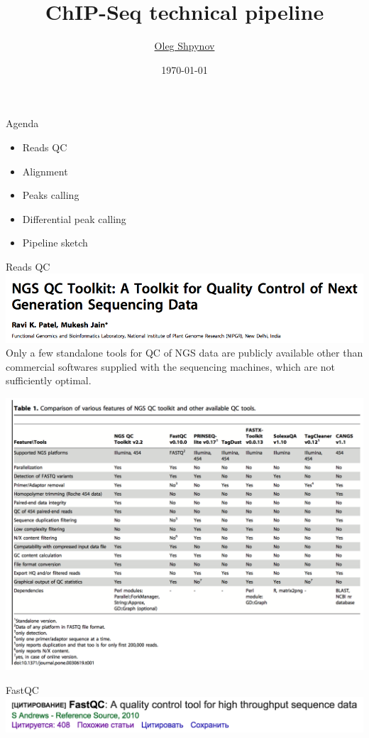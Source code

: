 \documentclass{beamer}
\title{ChIP-Seq technical pipeline}
\author{\href{mailto:os@jetbrains.com}{Oleg Shpynov}}
\institute{JetBrains Biolabs}
\date{\today}
\begin{document}
\begin{frame}
  \titlepage
\end{frame}

\begin{frame}{Agenda}
\begin{itemize}
	\item Reads QC
	\item Alignment
	\item Peaks calling
	\item Differential peak calling
	\item Pipeline sketch
\end{itemize}
\end{frame}

\begin{frame}{Reads QC}
\includegraphics[width=\linewidth]{ngstoolkit.png}\\
Only a few standalone tools for QC of NGS data are publicly available other than commercial softwares supplied with the sequencing machines, which are not sufficiently optimal.
\end{frame}

\begin{frame}
\includegraphics[width=\linewidth]{readsqc.png}
\end{frame}

\begin{frame}{FastQC}
\includegraphics[width=\linewidth]{fastqc.png}
\end{frame}
\end{document}
